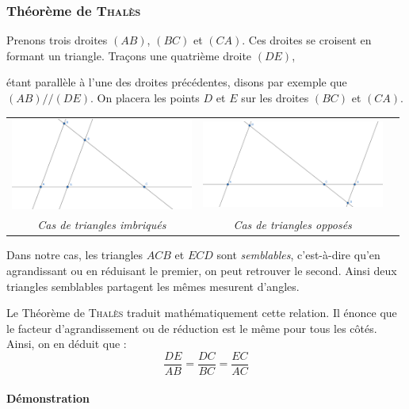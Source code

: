 \documentclass[a4paper, twoside]{article}
\begin{document}
\newpage

\subsubsection{Théorème de \textsc{Thalès}}

Prenons trois droites $(AB)$, $(BC)$ et $(CA)$.
Ces droites se croisent en formant un triangle.
Traçons une quatrième droite $(DE)$,

étant parallèle à l'une des droites précédentes,
disons par exemple que $(AB) // (DE)$.
On placera les points $D$ et $E$ sur les droites $(BC)$ et $(CA)$.

\begin{center}
	\begin{tabular}{ccc}
		\includegraphics[width=6cm]{Image/triangle_tales_1.png} & \includegraphics[width=6cm]{Image/triangle_tales_2.png} \\
		\textit{Cas de triangles imbriqués}                     & \textit{Cas de triangles opposés}                       \\
	\end{tabular}
\end{center}

Dans notre cas, les triangles $ACB$ et $ECD$ sont \emph{semblables},
c'est-à-dire qu'en agrandissant ou en réduisant le premier,
on peut retrouver le second. Ainsi deux triangles semblables
partagent les mêmes mesurent d'angles.

Le Théorème de \textsc{Thalès} traduit mathématiquement cette relation.
Il énonce que le facteur d'agrandissement ou de réduction est le même
pour tous les côtés.
Ainsi, on en déduit que : $$\frac{DE}{AB} = \frac{DC}{BC} = \frac{EC}{AC}$$

\paragraph*{Démonstration}
\end{document}

